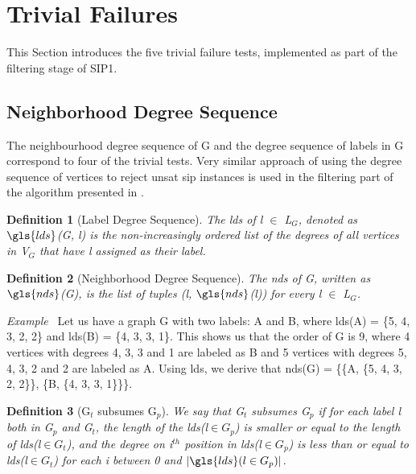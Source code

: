 \documentclass{l4proj}
\newcounter{example}[section]
\newenvironment{example}[1][]{\refstepcounter{example}\par\medskip
   \noindent \textit{Example~\theexample #1} \rmfamily}{\medskip}
\newtheorem{definition}{Definition}
\begin{document}
\section{Trivial Failures}
\label{sec:trivialFails}

This Section introduces the five trivial failure tests, implemented as part of the filtering stage of SIP1.

\subsection{Neighborhood Degree Sequence}
\label{sec:nds}
The neighbourhood degree sequence of G and the degree sequence of labels in G correspond to four of the trivial tests. Very similar approach of using the degree sequence of vertices to reject \gls{unsat} \gls{sip} instances is used in the filtering part of the algorithm presented in \cite{Solnon:2010}.
 
\begin{definition}[Label Degree Sequence]
The \textit{\gls{lds}} of \textit{l} $\in$ L$_{G}$, denoted as $\gls{lds}$(G, \textit{l}) is the non-increasingly ordered list of the degrees of all vertices in V$_{G}$ that have \textit{l} assigned as their label.    
\end{definition}

\begin{definition}[Neighborhood Degree Sequence]
The \textit{\gls{nds}} of G, written as $\gls{nds}$(G), is the list of tuples (\textit{l}, $\gls{nds}$(\textit{l})) for every \textit{l} $\in$ L$_{G}$.
\end{definition}

\begin{example}
Let us have a graph G with two labels: A and B, where \gls{lds}(A) = \{5, 4, 3, 2, 2\} and \gls{lds}(B) = \{4, 3, 3, 1\}. This shows us that the order of G is 9, where 4 vertices with degrees 4, 3, 3 and 1 are labeled as B and 5 vertices with degrees 5, 4, 3, 2 and 2 are labeled as A. Using \gls{lds}, we derive that \gls{nds}(G) = \{\{A, \{5, 4, 3, 2, 2\}\}, \{B, \{4, 3, 3, 1\}\}\}.
\end{example}

\begin{definition}[G$_{t}$ subsumes G$_{p}$]
\label{def:subsumes}
We say that G$_{t}$ subsumes G$_{p}$ if for each label l both in G$_{p}$ and G$_{t}$, the length of the \gls{lds}(l$\in G_{p}$) is smaller or equal to the length of \gls{lds}(l$\in G_{t}$), and the degree on i$^{th}$ position in \gls{lds}(l$\in G_{p}$) is less than or equal to \gls{lds}(l$\in G_{t}$) for each i between 0 and $|\gls{lds}(l\in G_{p})|$.
\end{definition}
\end{document}
